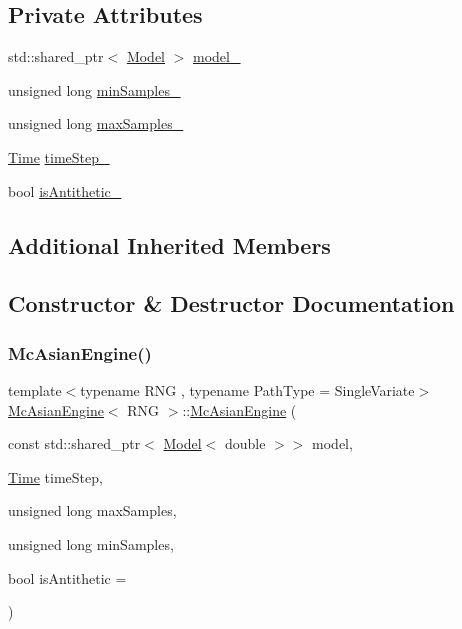 \subsection*{Private Attributes}
\begin{DoxyCompactItemize}
\item 
std\+::shared\+\_\+ptr$<$ \hyperlink{class_model}{Model} $>$ \hyperlink{class_mc_asian_engine_a8c94082ee2d4169b704428ebb4b30965}{model\+\_\+}
\item 
unsigned long \hyperlink{class_mc_asian_engine_a648fd96c21d0cd572e6dae0a1e8aa175}{min\+Samples\+\_\+}
\item 
unsigned long \hyperlink{class_mc_asian_engine_a50979acdba848660adb3f5aeb2169699}{max\+Samples\+\_\+}
\item 
\hyperlink{_name_def_8h_ac2d3e0ba793497bcca555c7c2cf64ff3}{Time} \hyperlink{class_mc_asian_engine_a4775a2c94f7267e29aaf614b454f3926}{time\+Step\+\_\+}
\item 
bool \hyperlink{class_mc_asian_engine_af78788fc48c368af0e677d60aee73406}{is\+Antithetic\+\_\+}
\end{DoxyCompactItemize}
\subsection*{Additional Inherited Members}


\subsection{Constructor \& Destructor Documentation}
\hypertarget{class_mc_asian_engine_a709959c19317f1dd319e043e409199fa}{}\label{class_mc_asian_engine_a709959c19317f1dd319e043e409199fa} 
\subsubsection{\texorpdfstring{Mc\+Asian\+Engine()}{McAsianEngine()}}
{\footnotesize\ttfamily template$<$typename R\+NG , typename Path\+Type  = Single\+Variate$>$ \\
\hyperlink{class_mc_asian_engine}{Mc\+Asian\+Engine}$<$ R\+NG $>$\+::\hyperlink{class_mc_asian_engine}{Mc\+Asian\+Engine} (\begin{DoxyParamCaption}\item[{const std\+::shared\+\_\+ptr$<$ \hyperlink{class_model}{Model}$<$ double $>$$>$}]{model,  }\item[{\hyperlink{_name_def_8h_ac2d3e0ba793497bcca555c7c2cf64ff3}{Time}}]{time\+Step,  }\item[{unsigned long}]{max\+Samples,  }\item[{unsigned long}]{min\+Samples,  }\item[{bool}]{is\+Antithetic = {} }\end{DoxyParamCaption})}



